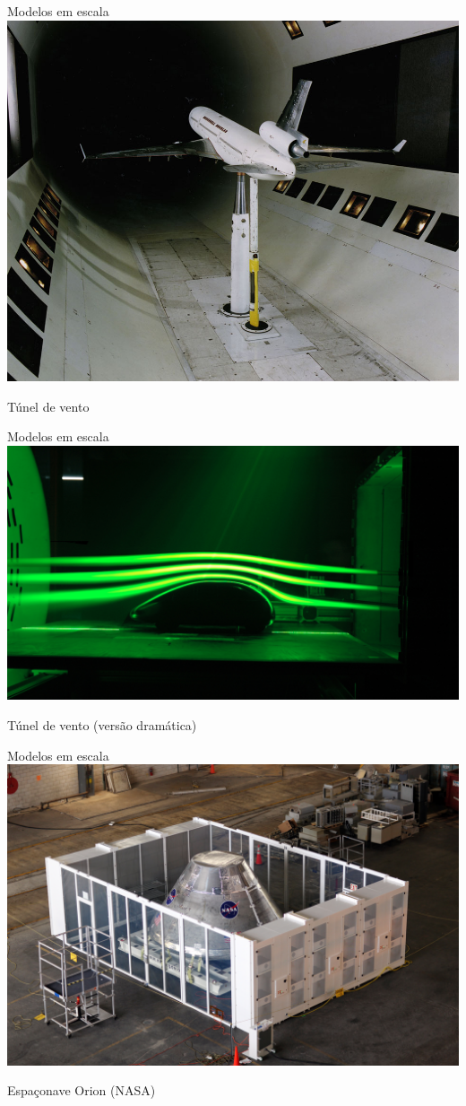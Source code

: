 \documentclass{beamer}
\begin{document}
\begin{frame}{Modelos em escala}
  \centering
  \includegraphics[width=.8\textwidth]{modelos/MD-11_12ft_Wind_Tunnel_Test}

Túnel de vento
\end{frame}

\begin{frame}{Modelos em escala}
  \centering
  \includegraphics[width=\textwidth]{modelos/wind_tunel}

Túnel de vento (versão dramática)
\end{frame}

\begin{frame}{Modelos em escala}
  \centering
  \includegraphics[width=.9\textwidth]{modelos/Orion_engineering_model_in_VAB_clean_room_01}

Espaçonave Orion (NASA)
\end{frame}
\end{document}
